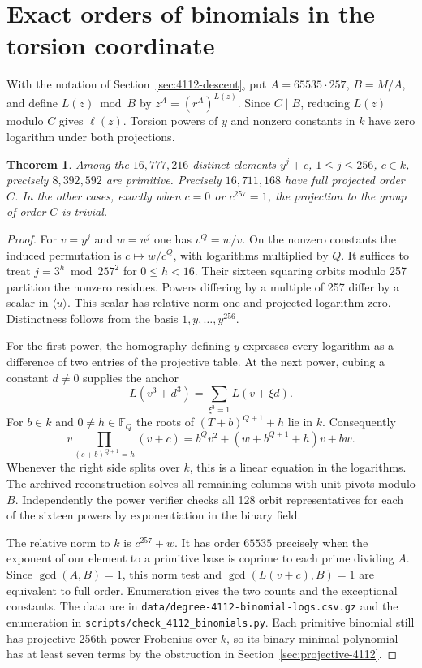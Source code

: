 \documentclass[11pt]{article}
\newtheorem{theorem}{Theorem}
\begin{document}
\section{Exact orders of binomials in the torsion coordinate}
\label{sec:4112-binomials}

With the notation of Section~\ref{sec:4112-descent}, put
\(A=65535\cdot257\), \(B=M/A\), and define \(L(z)\bmod B\)
by \(z^A=(r^A)^{L(z)}\). Since \(C\mid B\), reducing \(L(z)\)
modulo \(C\) gives \(\ell(z)\). Torsion powers of \(y\) and
nonzero constants in \(k\) have zero logarithm under both projections.

\begin{theorem}
Among the \(16{,}777{,}216\) distinct elements \(y^j+c\),
\(1\le j\le256\), \(c\in k\), precisely \(8{,}392{,}592\) are
primitive. Precisely \(16{,}711{,}168\) have full projected order
\(C\). In the other cases, exactly when \(c=0\) or \(c^{257}=1\),
the projection to the group of order \(C\) is trivial.
\end{theorem}
\begin{proof}
For \(v=y^j\) and \(w=u^j\) one has \(v^Q=w/v\).
On the nonzero constants the induced permutation is
\(c\mapsto w/c^Q\), with logarithms multiplied by \(Q\).
It suffices to treat \(j=3^h\bmod 257^2\) for \(0\le h<16\).
Their sixteen squaring orbits modulo 257 partition the nonzero
residues. Powers differing by a multiple of 257 differ by a
scalar in \(\langle u\rangle\). This scalar has relative norm one
and projected logarithm zero. Distinctness follows from the
basis \(1,y,\ldots,y^{256}\).

For the first power, the homography defining \(y\) expresses
every logarithm as a difference of two entries of the projective
table. At the next power, cubing a constant \(d\ne0\) supplies
the anchor
\[
       L(v^3+d^3)=\sum_{\xi^3=1} L(v+\xi d).
\]
For \(b\in k\) and \(0\ne h\in\mathbb F_Q\) the roots of
\((T+b)^{Q+1}+h\) lie in \(k\). Consequently
\[
 v\!\prod_{(c+b)^{Q+1}=h}(v+c)
   = b^Q v^2+(w+b^{Q+1}+h)v+bw.
\]
Whenever the right side splits over \(k\), this is a linear
equation in the logarithms. The archived reconstruction solves
all remaining columns with unit pivots modulo \(B\). Independently
the power verifier checks all 128 orbit representatives for each
of the sixteen powers by exponentiation in the binary field.

The relative norm to \(k\) is \(c^{257}+w\). It has order
\(65535\) precisely when the exponent of our element to a
primitive base is coprime to each prime dividing \(A\).
Since \(\gcd(A,B)=1\), this norm test and \(\gcd(L(v+c),B)=1\)
are equivalent to full order. Enumeration gives the two counts
and the exceptional constants. The data are in
\nolinkurl{data/degree-4112-binomial-logs.csv.gz} and the
enumeration in \nolinkurl{scripts/check_4112_binomials.py}.
Each primitive binomial still has projective 256th-power Frobenius
over \(k\), so its binary minimal polynomial has at least seven
terms by the obstruction in Section~\ref{sec:projective-4112}.
\end{proof}
\end{document}
